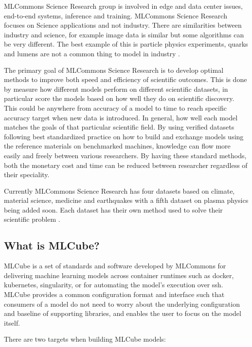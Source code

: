 \documentclass[sigplan,screen]{format/acmart}
\providecommand{\mlcube}{MLCube}
\begin{document}
MLCommons Science Research group is involved in edge and data center issues, end-to-end systems, inference and training. MLCommons Science Research focuses on Science applications and not industry. There are similarities between industry and science, for example image data is similar but some algorithms can be very different. The best example of this is particle physics experiments, quarks and lumens are not a common thing to model in industry \cite{www-mlcommons-science}. 

The primary goal of MLCommons Science Research is to develop optimal methods to improve both speed and efficiency of scientific outcomes. This is done by measure how different models perform on different scientific datasets, in particular score the models based on how well they do on scientific discovery. This could be anywhere from accuracy of a model to time to reach  specific accuracy target when new data is introduced. In general, how well each model matches the goals of that particular scientific field. By using verified datasets following best standardized practice on how to build and exchange models using the reference materials on benchmarked machines, knowledge can flow more easily and freely between various researchers. By having these standard methods, both the monetary cost and time can be reduced between researcher regardless of their speciality.

Currently MLCommons Science Research has four datasets based on climate, material science, medicine and earthquakes with a fifth dataset on plasma physics being added soon. Each dataset has their own method used to solve their scientific problem \cite{www-mlcommons-science}.

\subsection{What is \mlcube{}?}

\mlcube{} is  a set of standards and software developed by MLCommons for delivering machine learning models across container runtimes such as docker, kubernetes, singularity, or for automating the model's execution over ssh.
\mlcube{} provides a common configuration format and interface such that consumers of a model do not need to worry about the underlying configuration and baseline of supporting libraries, and enables the user to focus on the model itself\cite{www-mlcube}.

There are two targets when building \mlcube{} models:
\end{document}
